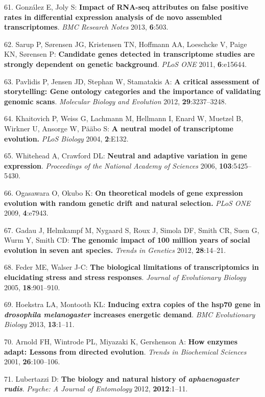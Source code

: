 \documentclass[]{article}
\begin{document}
61. Gonz{á}lez E, Joly S: \textbf{Impact of RNA-seq attributes on false
positive rates in differential expression analysis of de novo assembled
transcriptomes}. \emph{BMC Research Notes} 2013, \textbf{6}:503.

62. Sarup P, S{ø}rensen JG, Kristensen TN, Hoffmann AA, Loeschcke V,
Paige KN, S{ø}rensen P: \textbf{Candidate genes detected in
transcriptome studies are strongly dependent on genetic background}.
\emph{PLoS ONE} 2011, \textbf{6}:e15644.

63. Pavlidis P, Jensen JD, Stephan W, Stamatakis A: \textbf{A critical
assessment of storytelling: Gene ontology categories and the importance
of validating genomic scans}. \emph{Molecular Biology and Evolution}
2012, \textbf{29}:3237--3248.

64. Khaitovich P, Weiss G, Lachmann M, Hellmann I, Enard W, Muetzel B,
Wirkner U, Ansorge W, P{ä}{ä}bo S: \textbf{A neutral model of
transcriptome evolution.} \emph{PLoS Biology} 2004, \textbf{2}:E132.

65. Whitehead A, Crawford DL: \textbf{Neutral and adaptive variation in
gene expression}. \emph{Proceedings of the National Academy of Sciences}
2006, \textbf{103}:5425--5430.

66. Ogasawara O, Okubo K: \textbf{On theoretical models of gene
expression evolution with random genetic drift and natural selection.}
\emph{PLoS ONE} 2009, \textbf{4}:e7943.

67. Gadau J, Helmkampf M, Nygaard S, Roux J, Simola DF, Smith CR, Suen
G, Wurm Y, Smith CD: \textbf{The genomic impact of 100 million years of
social evolution in seven ant species.} \emph{Trends in Genetics} 2012,
\textbf{28}:14--21.

68. Feder ME, Walser J-C: \textbf{The biological limitations of
transcriptomics in elucidating stress and stress responses}.
\emph{Journal of Evolutionary Biology} 2005, \textbf{18}:901--910.

69. Hoekstra LA, Montooth KL: \textbf{Inducing extra copies of the hsp70
gene in \emph{drosophila melanogaster} increases energetic demand}.
\emph{BMC Evolutionary Biology} 2013, \textbf{13}:1--11.

70. Arnold FH, Wintrode PL, Miyazaki K, Gershenson A: \textbf{How
enzymes adapt: Lessons from directed evolution}. \emph{Trends in
Biochemical Sciences} 2001, \textbf{26}:100--106.

71. Lubertazzi D: \textbf{The biology and natural history of
\emph{aphaenogaster rudis}}. \emph{Psyche: A Journal of Entomology}
2012, \textbf{2012}:1--11.
\end{document}
